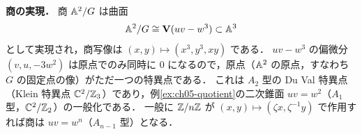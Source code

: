 \textbf{商の実現．}
商 $\mathbb{A}^2/G$ は曲面
\[
  \mathbb{A}^2/G\cong\mathbf{V}(uv-w^3)\subset\mathbb{A}^3
\]
として実現され，商写像は $(x,y)\mapsto(x^3,y^3,xy)$ である．
$uv-w^3$ の偏微分 $(v,u,-3w^2)$ は原点でのみ同時に $0$ になるので，原点（$\mathbb{A}^2$ の原点，すなわち $G$ の固定点の像）がただ一つの特異点である．
これは $A_2$ 型の Du Val 特異点（Klein 特異点 $\mathbb{C}^2/\mathbb{Z}_3$）であり，例\ref{ex:ch05-quotient}の二次錐面 $uv=w^2$（$A_1$ 型，$\mathbb{C}^2/\mathbb{Z}_2$）の一般化である．
一般に $\mathbb{Z}/n\mathbb{Z}$ が $(x,y)\mapsto(\zeta x,\zeta^{-1}y)$ で作用すれば商は $uv=w^n$（$A_{n-1}$ 型）となる．
